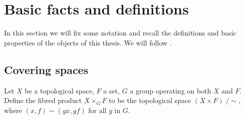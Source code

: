 \section{Basic facts and definitions}

In this section we will fix some notation and recall the definitions and basic properties of the objects of this thesis. We will follow 
\cite{Silverman2009}.

\iffalse
\subsection{Algebraic Curves}


\begin{defi}
 The \emph{$n$-dimensional affine space} is the set $\Abb^n$ of $n$-tuples with entries in $\Cbb$.
\end{defi}

\begin{defi}
 For an ideal $J\subset \Cbb[x_1,\ldots,x_n]$ we define the \emph{zero set $V(J)$ of $J$} as the set of points $p \in \Cbb$. For a subset 
$X\subset \Abb^n$ we define the \emph{ideal $I(V)$ of $X$} as usual.
\end{defi}
\fi

\subsection{Covering spaces} \label{sec:covering-spaces}

\begin{defi}
 Let $X$ be a topological space, $F$ a set, $G$ a group operating on both $X$ and $F$. Define the fibred product $X \times_{G} F$ to be the topological space $(X\times F)\; /\sim$, where $(x,f)\sim (gx,gf)$ for all $g$ in $G$.
\end{defi}

